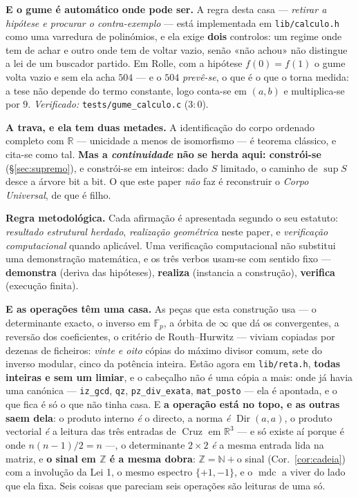 \documentclass[11pt,a4paper]{article}
\newcommand{\code}[1]{\texttt{\small #1}}
\begin{document}
\noindent\textbf{E o gume é automático onde pode ser.} A regra desta casa ---
\emph{retirar a hipótese e procurar o contra-exemplo} --- está implementada em
\code{lib/calculo.h} como uma varredura de polinómios, e ela exige \textbf{dois}
controlos: um regime onde tem de achar e outro onde tem de voltar vazio, senão «não
achou» não distingue a lei de um buscador partido. Em Rolle, com a hipótese
$f(0)=f(1)$ o gume volta vazio e sem ela acha $504$ --- e o $504$ \emph{prevê-se}, o
que é o que o torna medida: a tese não depende do termo constante, logo conta-se em
$(a,b)$ e multiplica-se por $9$. \emph{Verificado:} \code{tests/gume\_calculo.c}
($3{:}0$).

\medskip
\noindent\textbf{A trava, e ela tem duas metades.} A identificação do corpo
ordenado completo com $\mathbb{R}$ --- unicidade a menos de isomorfismo --- é
teorema clássico, e cita-se como tal. \textbf{Mas a \emph{continuidade} não se
herda aqui: constrói-se} (\S\ref{sec:supremo}), e constrói-se em inteiros: dado
$S$ limitado, o caminho de $\sup S$ desce a árvore bit a bit. O que este paper
\emph{não} faz é reconstruir o \emph{Corpo Universal}, de que é filho.

\medskip
\noindent\textbf{Regra metodológica.} Cada afirmação é apresentada segundo o seu
estatuto: \emph{resultado estrutural herdado}, \emph{realização geométrica} neste
paper, e \emph{verificação computacional} quando aplicável. Uma verificação
computacional não substitui uma demonstração matemática, e os três verbos usam-se
com sentido fixo --- \textbf{demonstra} (deriva das hipóteses), \textbf{realiza}
(instancia a construção), \textbf{verifica} (execução finita).

\medskip
\noindent\textbf{E as operações têm uma casa.} As peças que esta construção usa --- o
determinante exacto, o inverso em $\mathbb{F}_p$, a órbita de $\infty$ que dá os
convergentes, a reversão dos coeficientes, o critério de Routh--Hurwitz --- viviam
copiadas por dezenas de ficheiros: \emph{vinte e oito} cópias do máximo divisor comum,
sete do inverso modular, cinco da potência inteira. Estão agora em \code{lib/reta.h},
\textbf{todas inteiras e sem um limiar}, e o cabeçalho não é uma cópia a mais: onde já
havia uma canónica --- \code{iz\_gcd}, \code{qz}, \code{pz\_div\_exata},
\code{mat\_posto} --- ela é apontada, e o que fica é só o que não tinha casa.
E \textbf{a operação está no topo, e as outras saem dela}: o produto interno \emph{é} o
directo, a norma \emph{é} $\operatorname{Dir}(a,a)$, o produto vectorial \emph{é} a
leitura das três entradas de $\operatorname{Cruz}$ em $\mathbb{R}^3$ --- e só existe aí
porque é onde $n(n-1)/2=n$ ---, o determinante $2\times2$ \emph{é} a mesma entrada lida
na matriz, e \textbf{o sinal em $\mathbb{Z}$ é a mesma dobra}: $\mathbb{Z}=\mathbb{N}+{}$o
sinal (Cor.~\ref{cor:cadeia}) com a involução da Lei 1, o mesmo espectro $\{+1,-1\}$, e o
$\operatorname{mdc}$ a viver do lado que ela fixa. Seis coisas que pareciam seis operações
são leituras de uma só.
\end{document}
